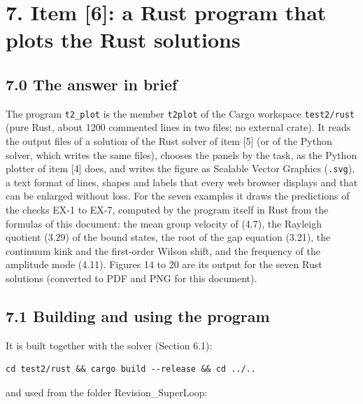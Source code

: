 \documentclass[
  10pt,
]{article}
\begin{document}
\hypertarget{item-6-a-rust-program-that-plots-the-rust-solutions}{%
\section{7. Item {[}6{]}: a Rust program that plots the Rust
solutions}\label{item-6-a-rust-program-that-plots-the-rust-solutions}}

\hypertarget{the-answer-in-brief-5}{%
\subsection{7.0 The answer in brief}\label{the-answer-in-brief-5}}

The program \texttt{t2\_plot} is the member \texttt{t2plot} of the Cargo
workspace \texttt{test2/rust} (pure Rust, about 1200 commented lines in
two files; no external crate). It reads the output files of a solution
of the Rust solver of item {[}5{]} (or of the Python solver, which
writes the same files), chooses the panels by the task, as the Python
plotter of item {[}4{]} does, and writes the figure as Scalable Vector
Graphics (\texttt{.svg}), a text format of lines, shapes and labels that
every web browser displays and that can be enlarged without loss. For
the seven examples it draws the predictions of the checks EX-1 to EX-7,
computed by the program itself in Rust from the formulas of this
document: the mean group velocity of (4.7), the Rayleigh quotient (3.29)
of the bound states, the root of the gap equation (3.21), the continuum
kink and the first-order Wilson shift, and the frequency of the
amplitude mode (4.11). Figures 14 to 20 are its output for the seven
Rust solutions (converted to PDF and PNG for this document).

\hypertarget{building-and-using-the-program}{%
\subsection{7.1 Building and using the
program}\label{building-and-using-the-program}}

It is built together with the solver (Section 6.1):

\begin{verbatim}
cd test2/rust && cargo build --release && cd ../..
\end{verbatim}

and used from the folder Revision\_SuperLoop:
\end{document}
